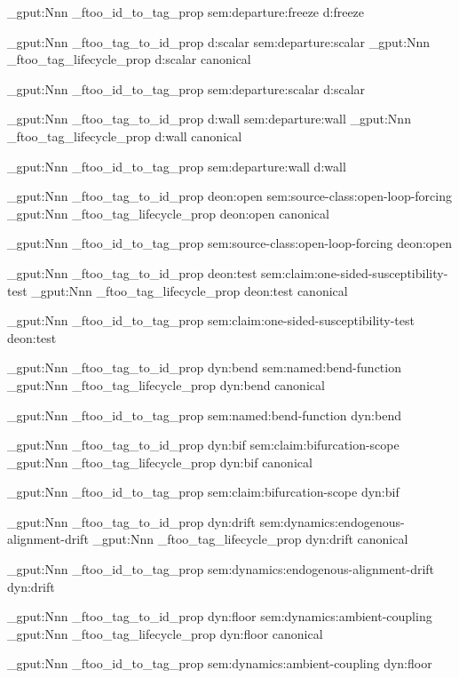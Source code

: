 \prop_gput:Nnn \g_ftoo_id_to_tag_prop { sem:departure:freeze } { d:freeze }


\prop_gput:Nnn \g_ftoo_tag_to_id_prop { d:scalar } { sem:departure:scalar }
\prop_gput:Nnn \g_ftoo_tag_lifecycle_prop { d:scalar } { canonical }

\prop_gput:Nnn \g_ftoo_id_to_tag_prop { sem:departure:scalar } { d:scalar }


\prop_gput:Nnn \g_ftoo_tag_to_id_prop { d:wall } { sem:departure:wall }
\prop_gput:Nnn \g_ftoo_tag_lifecycle_prop { d:wall } { canonical }

\prop_gput:Nnn \g_ftoo_id_to_tag_prop { sem:departure:wall } { d:wall }


\prop_gput:Nnn \g_ftoo_tag_to_id_prop { deon:open } { sem:source-class:open-loop-forcing }
\prop_gput:Nnn \g_ftoo_tag_lifecycle_prop { deon:open } { canonical }

\prop_gput:Nnn \g_ftoo_id_to_tag_prop { sem:source-class:open-loop-forcing } { deon:open }


\prop_gput:Nnn \g_ftoo_tag_to_id_prop { deon:test } { sem:claim:one-sided-susceptibility-test }
\prop_gput:Nnn \g_ftoo_tag_lifecycle_prop { deon:test } { canonical }

\prop_gput:Nnn \g_ftoo_id_to_tag_prop { sem:claim:one-sided-susceptibility-test } { deon:test }


\prop_gput:Nnn \g_ftoo_tag_to_id_prop { dyn:bend } { sem:named:bend-function }
\prop_gput:Nnn \g_ftoo_tag_lifecycle_prop { dyn:bend } { canonical }

\prop_gput:Nnn \g_ftoo_id_to_tag_prop { sem:named:bend-function } { dyn:bend }


\prop_gput:Nnn \g_ftoo_tag_to_id_prop { dyn:bif } { sem:claim:bifurcation-scope }
\prop_gput:Nnn \g_ftoo_tag_lifecycle_prop { dyn:bif } { canonical }

\prop_gput:Nnn \g_ftoo_id_to_tag_prop { sem:claim:bifurcation-scope } { dyn:bif }


\prop_gput:Nnn \g_ftoo_tag_to_id_prop { dyn:drift } { sem:dynamics:endogenous-alignment-drift }
\prop_gput:Nnn \g_ftoo_tag_lifecycle_prop { dyn:drift } { canonical }

\prop_gput:Nnn \g_ftoo_id_to_tag_prop { sem:dynamics:endogenous-alignment-drift } { dyn:drift }


\prop_gput:Nnn \g_ftoo_tag_to_id_prop { dyn:floor } { sem:dynamics:ambient-coupling }
\prop_gput:Nnn \g_ftoo_tag_lifecycle_prop { dyn:floor } { canonical }

\prop_gput:Nnn \g_ftoo_id_to_tag_prop { sem:dynamics:ambient-coupling } { dyn:floor }


